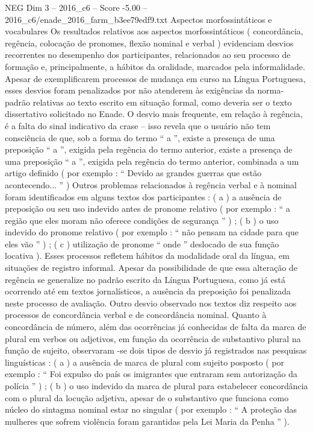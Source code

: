 \begin{textsample}{NEG Dim 3 – 2016\_c6 – Score -5.00 – 2016\_c6/enade\_2016\_farm\_b3ee79edf9.txt}
Aspectos morfossintáticos e vocabulares Os resultados relativos aos aspectos morfossintáticos ( concordância, regência, colocação de pronomes, flexão nominal e verbal ) evidenciam desvios recorrentes no desempenho dos participantes, relacionados ao seu processo de formação e, principalmente, a hábitos da oralidade, marcados pela informalidade.
Apesar de exemplificarem processos de mudança em curso na Língua Portuguesa, esses desvios foram penalizados por não atenderem às exigências da norma-padrão relativas ao texto escrito em situação formal, como deveria ser o texto dissertativo solicitado no Enade.
O desvio mais frequente, em relação à regência, é a falta do sinal indicativo da crase – isso revela que o usuário não tem consciência de que, sob a forma do termo “ a ”, existe a presença de uma preposição “ a ”, exigida pela regência do termo anterior, existe a presença de uma preposição “ a ”, exigida pela regência do termo anterior, combinada a um artigo definido ( por exemplo : “ Devido as grandes guerras que estão acontecendo... ” ) Outros problemas relacionados à regência verbal e à nominal foram identificados em alguns textos dos participantes : ( a ) a ausência de preposição ou seu uso indevido antes de pronome relativo ( por exemplo : “ a região que eles moram não oferece condições de segurança ” ) ; ( b ) o uso indevido do pronome relativo ( por exemplo : “ não pensam na cidade para que eles vão ” ) ; ( c ) utilização de pronome “ onde ” deslocado de sua função locativa ).
Esses processos refletem hábitos da modalidade oral da língua, em situações de registro informal.
Apesar da possibilidade de que essa alteração de regência se generalize no padrão escrito da Língua Portuguesa, como já está ocorrendo até em textos jornalísticos, a ausência da preposição foi penalizada neste processo de avaliação.
Outro desvio observado nos textos diz respeito aos processos de concordância verbal e de concordância nominal.
Quanto à concordância de número, além das ocorrências já conhecidas de falta da marca de plural em verbos ou adjetivos, em função da ocorrência de substantivo plural na função de sujeito, observaram -se dois tipos de desvio já registrados nas pesquisas linguísticas : ( a ) a ausência de marca de plural com sujeito posposto ( por exemplo : “ Foi expulso do país os imigrantes que entraram sem autorização da polícia ” ) ; ( b ) o uso indevido da marca de plural para estabelecer concordância com o plural da locução adjetiva, apesar de o substantivo que funciona como núcleo do sintagma nominal estar no singular ( por exemplo : “ A proteção das mulheres que sofrem violência foram garantidas pela Lei Maria da Penha ” ).

\end{textsample}
